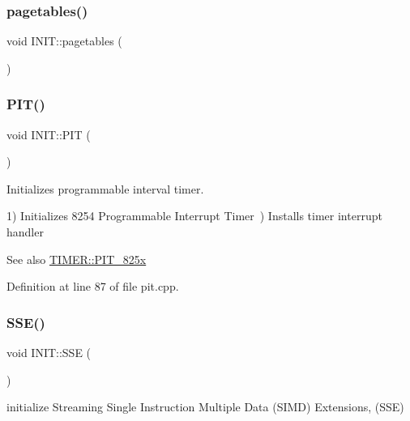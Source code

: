 \subsubsection{\texorpdfstring{pagetables()}{pagetables()}}
{\footnotesize\ttfamily void I\+N\+I\+T\+::pagetables (\begin{DoxyParamCaption}{ }\end{DoxyParamCaption})}

\mbox{\label{namespace_i_n_i_t_a6fa46ed9b50062458ede3692a4865c51}} 
\subsubsection{\texorpdfstring{P\+I\+T()}{PIT()}}
{\footnotesize\ttfamily void I\+N\+I\+T\+::\+P\+IT (\begin{DoxyParamCaption}{ }\end{DoxyParamCaption})}



Initializes programmable interval timer. 

1) Initializes 8254 Programmable Interrupt Timer~) Installs timer interrupt handler \begin{DoxySeeAlso}{See also}
\hyperlink{namespace_t_i_m_e_r_a9914c0026a4661367482a01e7834500e}{T\+I\+M\+E\+R\+::\+P\+I\+T\+\_\+825x} 
\end{DoxySeeAlso}


Definition at line 87 of file pit.\+cpp.

\mbox{\label{namespace_i_n_i_t_a8928ddbb4ca671dfe1c740da380fa0c4}} 
\subsubsection{\texorpdfstring{S\+S\+E()}{SSE()}}
{\footnotesize\ttfamily void I\+N\+I\+T\+::\+S\+SE (\begin{DoxyParamCaption}{ }\end{DoxyParamCaption})}



initialize Streaming Single Instruction Multiple Data (S\+I\+MD) Extensions, (S\+SE) 


